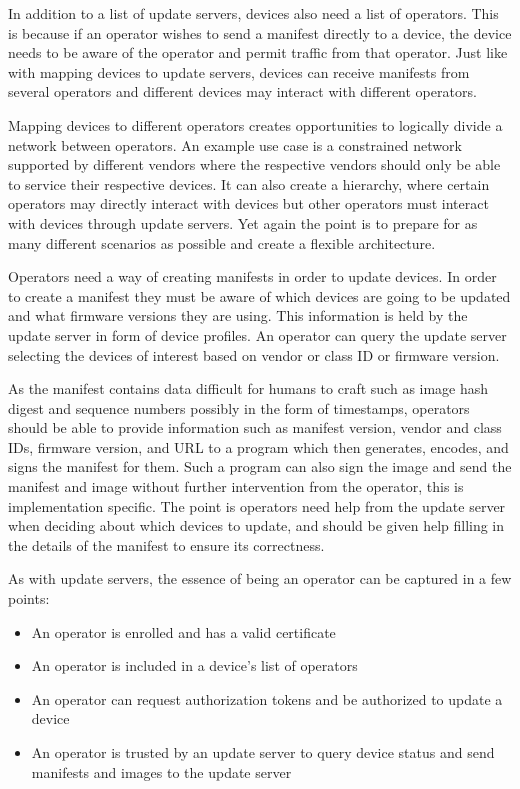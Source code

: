\documentclass[0-thesis.tex]{subfiles}
\begin{document}
In addition to a list of update servers, devices also need a list of operators. This is
because if an operator wishes to send a manifest directly to a device, the device needs to
be aware of the operator and permit traffic from that operator. Just like with mapping
devices to update servers, devices can receive manifests from several operators and
different devices may interact with different operators. 

Mapping devices to different operators creates opportunities to logically divide a network
between operators. An example use case is a constrained network supported by different
vendors where the respective vendors should only be able to service their respective
devices. It can also create a hierarchy, where certain operators may directly interact
with devices but other operators must interact with devices through update servers. Yet
again the point is to prepare for as many different scenarios as possible and create a
flexible architecture.

Operators need a way of creating manifests in order to update devices. In order to create
a manifest they must be aware of which devices are going to be updated and what firmware
versions they are using. This information is held by the update server in form of device
profiles. An operator can query the update server selecting the devices of interest based
on vendor or class ID or firmware version. 

As the manifest contains data difficult for humans to craft such as image hash digest and
sequence numbers possibly in the form of timestamps, operators should be able to provide
information such as manifest version, vendor and class IDs, firmware version, and URL to a
program which then generates, encodes, and signs the manifest for them. Such a program can
also sign the image and send the manifest and image without further intervention from the
operator, this is implementation specific. The point is operators need help from the
update server when deciding about which devices to update, and should be given help
filling in the details of the manifest to ensure its correctness.

As with update servers, the essence of being an operator can be captured in a few points:

\begin{itemize}
    \item An operator is enrolled and has a valid certificate
    \item An operator is included in a device's list of operators
    \item An operator can request authorization tokens and be authorized to update a
            device
    \item An operator is trusted by an update server to query device status and send
            manifests and images to the update server
\end{itemize}
\end{document}
